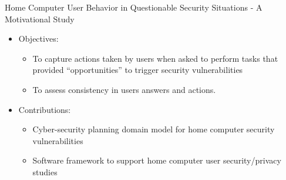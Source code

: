 \begin{frame} {Home Computer User Behavior in Questionable Security Situations - A Motivational Study}
\begin{itemize}
\item Objectives:
\begin{itemize}
\item To capture actions taken by users when asked to perform tasks that provided ``opportunities'' to trigger security vulnerabilities
\item To assess consistency in users answers and actions.
\end{itemize}
\item Contributions:
\begin{itemize}
\item Cyber-security planning domain model for home computer security vulnerabilities
\item Software framework to support home computer user security/privacy studies
\end{itemize}
\end{itemize}
\end{frame}